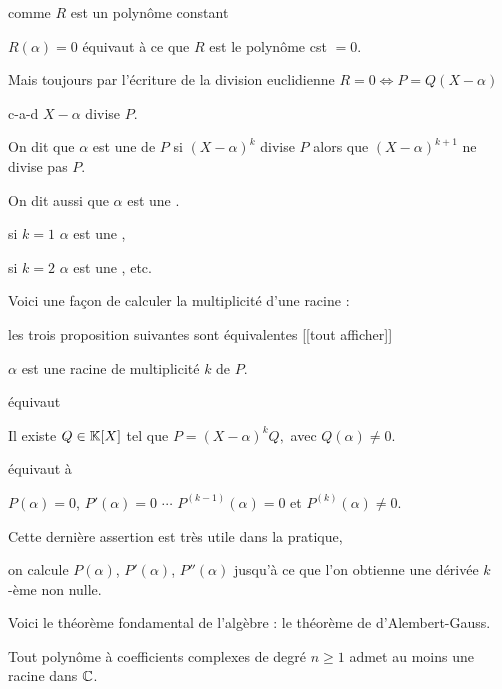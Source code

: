 comme $R$ est un polynôme constant 

\change

$R(\alpha) =0$
équivaut à ce que $R$ est le polynôme cst  $=0$.

\change

Mais toujours par l'écriture de la division euclidienne
$R=0 \iff P = Q(X-\alpha)$ 

\change

c-a-d $X-\alpha$ divise $P$.  

\diapo

On dit que $\alpha$ est une 
 de $P$ si $(X-\alpha )^k$ divise $P$ alors que $(X- \alpha )^{k+1}$ ne divise pas $P$.

On dit aussi que $\alpha$ est une .

\change

si $k=1$ $\alpha$ est une , 

\change

si $k=2$ $\alpha$ est une , etc.

\change


Voici une façon de calculer la multiplicité d'une racine :


\change


les trois proposition suivantes sont équivalentes [[tout afficher]]

\change

\change


$\alpha$ est une racine de multiplicité $k$ de $P$.

équivaut

Il existe  $Q \in\mathbb{K}[X]$ tel que $P=(X-\alpha)^kQ,$ avec $Q(\alpha) \neq 0$.


équivaut à

$P(\alpha)= 0$, $P'(\alpha)=0$ $\cdots$ $P^{(k-1)}(\alpha)=0$ et $P^{(k)}(\alpha) \neq 0$.

Cette dernière assertion est très utile dans la pratique,

on calcule $P(\alpha)$, $P'(\alpha)$, $P''(\alpha)$
jusqu'à ce que l'on obtienne une dérivée $k$-ème non nulle.


\diapo

Voici le théorème fondamental de l'algèbre : le théorème de d'Alembert-Gauss.

Tout polynôme à coefficients complexes de degré $n \ge 1$  
admet au moins une racine dans $\mathbb{C}$.

